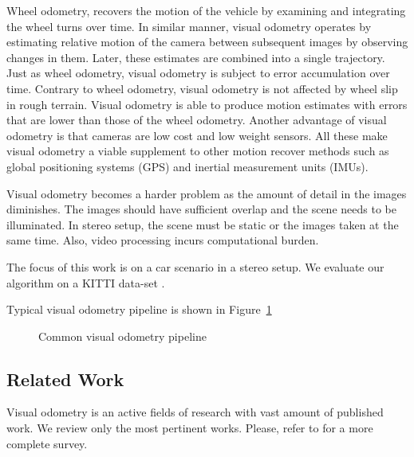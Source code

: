 \documentclass[runningheads]{llncs}
\begin{document}
Wheel odometry, recovers the motion of the vehicle by examining and
integrating the wheel turns over time.  In similar manner, visual
odometry operates by estimating relative motion of the camera between
subsequent images by observing changes in them. Later, these estimates
are combined into a single trajectory. Just as wheel odometry, visual
odometry is subject to error accumulation over time. Contrary to wheel
odometry, visual odometry is not affected by wheel slip in rough
terrain. Visual odometry is able to produce motion estimates with
errors that are lower than those of the wheel odometry. Another
advantage of visual odometry is that cameras are low cost and low
weight sensors.  All these make visual odometry a viable supplement to
other motion recover methods such as global positioning systems (GPS)
and inertial measurement units (IMUs).

Visual odometry becomes a harder problem as the amount of detail in
the images diminishes. The images should have sufficient overlap and
the scene needs to be illuminated.  In stereo setup, the scene must be
static or the images taken at the same time. Also, video processing
incurs computational burden.

The focus of this work is on a car scenario in a stereo setup. We
evaluate our algorithm on a KITTI data-set \cite{Geiger2012}.

Typical visual odometry pipeline is shown in Figure~\ref{fig:pipeline}

\begin{figure}
  \begin{center}
    
  \end{center}
  \caption{Common visual odometry pipeline}
  \label{fig:pipeline}
\end{figure}

\subsection{Related Work}
Visual odometry is an active fields of research with vast amount of
published work.  We review only the most pertinent works. Please,
refer to \cite{Scaramuzza2011} for a more complete survey.
\end{document}
